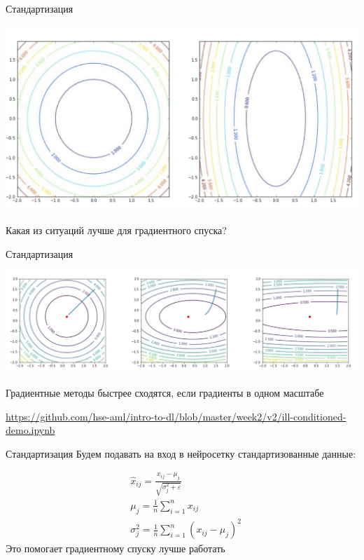 \documentclass[notes,12pt, aspectratio=169]{beamer}
\begin{document}
\begin{frame}{Стандартизация}
	\begin{center}
		\includegraphics[width=.8\linewidth]{standartization.png}
	\end{center}
	
	\begin{center}
		Какая из ситуаций лучше для градиентного спуска? 
	\end{center}
\end{frame}


\begin{frame}{Стандартизация}
	\begin{center}
		\includegraphics[width=.99\linewidth]{standartization2.png}
	\end{center}
	
	\alert{Градиентные методы быстрее сходятся, если градиенты в одном масштабе}
	
	\vfill %
	\footnotesize
	{\color{blue} \url{https://github.com/hse-aml/intro-to-dl/blob/master/week2/v2/ill-conditioned-demo.ipynb}}
\end{frame}


\begin{frame}{Стандартизация}
	Будем подавать на вход в нейросетку стандартизованные данные:
	
	\begin{equation*}
		\begin{aligned}
			&\hat{x}_{ij} = \frac{x_{ij} - \mu_j}{\sqrt{\sigma^2_j + \varepsilon}} \\
			&\mu_j = \frac{1}{n} \sum_{i=1}^n x_{ij} \\
			& \sigma^2_j =  \frac{1}{n} \sum_{i=1}^n (x_{ij} - \mu_j)^2
		\end{aligned}
	\end{equation*}
	\vfill \centering
	\alert{Это помогает градиентному спуску лучше работать}
\end{frame}
\end{document}
